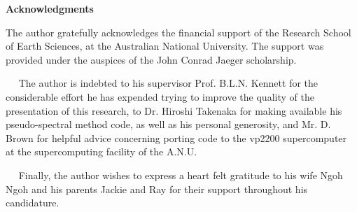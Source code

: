 \vspace*{30mm}
\begin{center}
{\bf Acknowledgments}
\end{center}
\begin{center}
\begin{minipage} {80.0mm}
The author gratefully acknowledges the financial support of the Research School of Earth Sciences, 
at the Australian National University. The support was provided under the auspices of the 
John Conrad Jaeger scholarship.

$\quad$ The author is indebted to his supervisor Prof. B.L.N. Kennett for the considerable
 effort he has expended trying to improve 
the quality of the presentation of this research, to Dr. Hiroshi Takenaka for making available his 
pseudo-spectral method code, as well as his personal generosity, and Mr. D. Brown for helpful 
advice concerning porting code to the 
vp2200 supercomputer at the supercomputing facility of the A.N.U.

$\quad$ Finally, the author wishes to express a heart felt gratitude to his wife Ngoh Ngoh and 
his parents Jackie and Ray for their support throughout his candidature.
\end{minipage}
\end{center}


